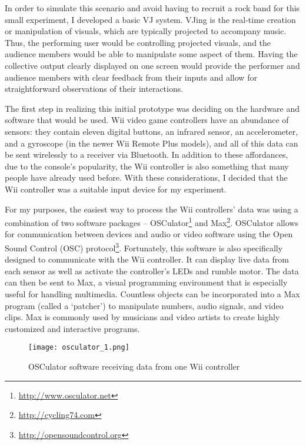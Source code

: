 In order to simulate this scenario and avoid having to recruit a rock band for this small experiment, I developed a basic VJ system. VJing is the real-time creation or manipulation of visuals, which are typically projected to accompany music. Thus, the performing user would be controlling projected visuals, and the audience members would be able to manipulate some aspect of them. Having the collective output clearly displayed on one screen would provide the performer and audience members with clear feedback from their inputs and allow for straightforward observations of their interactions.

The first step in realizing this initial prototype was deciding on the hardware and software that would be used. Wii video game controllers have an abundance of sensors: they contain eleven digital buttons, an infrared sensor, an accelerometer, and a gyroscope (in the newer Wii Remote Plus models), and all of this data can be sent wirelessly to a receiver via Bluetooth. In addition to these affordances, due to the console's popularity, the Wii controller is also something that many people have already used before. With these considerations, I decided that the Wii controller was a suitable input device for my experiment. 

For my purposes, the easiest way to process the Wii controllers' data was using a combination of two software packages -- OSCulator\footnote{\url{http://www.osculator.net}} and Max\footnote{\url{http://cycling74.com}}. OSCulator allows for communication between devices and audio or video software using the Open Sound Control (OSC) protocol\footnote{\url{http://opensoundcontrol.org}}. Fortunately, this software is also specifically designed to communicate with the Wii controller. It can display live data from each sensor as well as activate the controller's LEDs and rumble motor. The data can then be sent to Max, a visual programming environment that is especially useful for handling multimedia. Countless objects can be incorporated into a Max program (called a `patcher') to manipulate numbers, audio signals, and video clips. Max is commonly used by musicians and video artists to create highly customized and interactive programs.

\begin{figure}
	\centering

	\texttt{[image: osculator\_1.png]}
	\caption{OSCulator software receiving data from one Wii controller}

	\label{prototyping1.1}
\end{figure}

